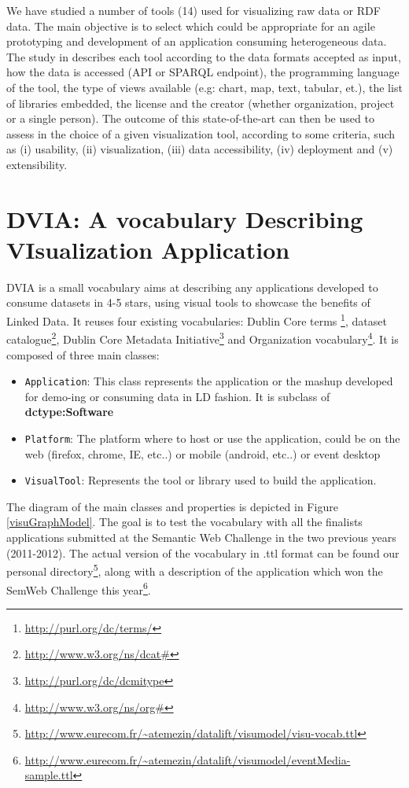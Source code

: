 \documentclass[a4paper,11pt]{report}
\begin{document}
We have studied a number of tools (14) used for visualizing raw data or RDF data. The main objective is to select which could be appropriate for an agile prototyping and development of an application consuming heterogeneous data. 
The study in \cite{deliverable2012b} describes each tool according to the data formats accepted as input, how the data is accessed (API or SPARQL endpoint), the programming language of the tool, the type of views available (e.g: chart, map, text, tabular, et.), the list of libraries embedded, the license and the creator (whether organization, project or a single person). The outcome of this state-of-the-art can then be used to assess in the choice of a given visualization tool, according to some criteria, such as (i) usability, (ii) visualization, (iii) data accessibility, (iv) deployment and (v) extensibility. 



\section{DVIA: A vocabulary   Describing VIsualization Application}
DVIA is a small vocabulary aims at describing any applications developed to consume datasets in 4-5 stars, using visual tools to showcase the benefits of Linked Data. It reuses four existing vocabularies: Dublin Core terms \footnote{\url{http://purl.org/dc/terms/}}, dataset catalogue\footnote{\url{http://www.w3.org/ns/dcat#}}, Dublin Core Metadata Initiative\footnote{\url{http://purl.org/dc/dcmitype}} and Organization vocabulary\footnote{\url{http://www.w3.org/ns/org#}}.  It is composed of three main classes: 

\begin{itemize}
\item \texttt{Application}: This class represents the application or the mashup developed for demo-ing or consuming data in LD fashion. It is subclass of \textbf{dctype:Software}
\item \texttt{Platform}: The platform where to host or use the application, could be on the web (firefox, chrome, IE, etc..) or mobile (android, etc..) or event desktop
\item \texttt{VisualTool}: Represents the tool or library used to build the application. 
\end{itemize}

The diagram of the main classes and properties is depicted in Figure \ref{visuGraphModel}. The goal is to test the vocabulary with all the finalists applications submitted at the Semantic Web Challenge in  the two previous years (2011-2012). The actual version of the vocabulary in .ttl format can be found our personal directory\footnote{\url{http://www.eurecom.fr/~atemezin/datalift/visumodel/visu-vocab.ttl}}, along with a description of the application which won the SemWeb Challenge this year\footnote{\url{http://www.eurecom.fr/~atemezin/datalift/visumodel/eventMedia-sample.ttl}}. 
\end{document}
